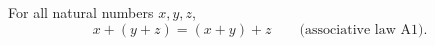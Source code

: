 For all natural numbers $x, y, z$,
$$x + (y + z) = (x + y) + z \qquad \text{(associative law A1)}.$$
